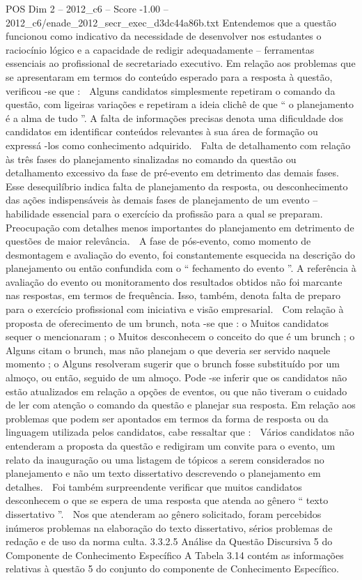 \begin{textsample}{POS Dim 2 – 2012\_c6 – Score -1.00 – 2012\_c6/enade\_2012\_secr\_exec\_d3dc44a86b.txt}
Entendemos que a questão funcionou como indicativo da necessidade de desenvolver nos estudantes o raciocínio lógico e a capacidade de redigir adequadamente – ferramentas essenciais ao profissional de secretariado executivo.
Em relação aos problemas que se apresentaram em termos do conteúdo esperado para a resposta à questão, verificou -se que :  Alguns candidatos simplesmente repetiram o comando da questão, com ligeiras variações e repetiram a ideia clichê de que “ o planejamento é a alma de tudo ”.
A falta de informações precisas denota uma dificuldade dos candidatos em identificar conteúdos relevantes à sua área de formação ou expressá -los como conhecimento adquirido.  Falta de detalhamento com relação às três fases do planejamento sinalizadas no comando da questão ou detalhamento excessivo da fase de pré-evento em detrimento das demais fases.
Esse desequilíbrio indica falta de planejamento da resposta, ou desconhecimento das ações indispensáveis às demais fases de planejamento de um evento – habilidade essencial para o exercício da profissão para a qual se preparam.  Preocupação com detalhes menos importantes do planejamento em detrimento de questões de maior relevância.  A fase de pós-evento, como momento de desmontagem e avaliação do evento, foi constantemente esquecida na descrição do planejamento ou então confundida com o “ fechamento do evento ”.
A referência à avaliação do evento ou monitoramento dos resultados obtidos não foi marcante nas respostas, em termos de frequência.
Isso, também, denota falta de preparo para o exercício profissional com iniciativa e visão empresarial.  Com relação à proposta de oferecimento de um brunch, nota -se que : o Muitos candidatos sequer o mencionaram ; o Muitos desconhecem o conceito do que é um brunch ; o Alguns citam o brunch, mas não planejam o que deveria ser servido naquele momento ; o Alguns resolveram sugerir que o brunch fosse substituído por um almoço, ou então, seguido de um almoço.
Pode -se inferir que os candidatos não estão atualizados em relação a opções de eventos, ou que não tiveram o cuidado de ler com atenção o comando da questão e planejar sua resposta.
Em relação aos problemas que podem ser apontados em termos da forma de resposta ou da linguagem utilizada pelos candidatos, cabe ressaltar que :  Vários candidatos não entenderam a proposta da questão e redigiram um convite para o evento, um relato da inauguração ou uma listagem de tópicos a serem considerados no planejamento e não um texto dissertativo descrevendo o planejamento em detalhes.  Foi também surpreendente verificar que muitos candidatos desconhecem o que se espera de uma resposta que atenda ao gênero “ texto dissertativo ”.  Nos que atenderam ao gênero solicitado, foram percebidos inúmeros problemas na elaboração do texto dissertativo, sérios problemas de redação e de uso da norma culta. 3.3.2.5 Análise da Questão Discursiva 5 do Componente de Conhecimento Específico A Tabela 3.14 contém as informações relativas à questão 5 do conjunto do componente de Conhecimento Específico.

\end{textsample}

